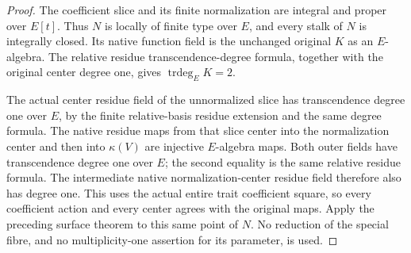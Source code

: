 \begin{proof}
The coefficient slice and its finite normalization are integral and proper over $E[t]$. Thus $N$ is locally of finite type over $E$, and every stalk of $N$ is integrally closed. Its native function field is the unchanged original $K$ as an $E$-algebra. The relative residue transcendence-degree formula, together with the original center degree one, gives $\operatorname{trdeg}_E K=2$.

The actual center residue field of the unnormalized slice has transcendence degree one over $E$, by the finite relative-basis residue extension and the same degree formula. The native residue maps from that slice center into the normalization center and then into $\kappa(V)$ are injective $E$-algebra maps. Both outer fields have transcendence degree one over $E$; the second equality is the same relative residue formula. The intermediate native normalization-center residue field therefore also has degree one. This uses the actual entire trait coefficient square, so every coefficient action and every center agrees with the original maps. Apply the preceding surface theorem to this same point of $N$. No reduction of the special fibre, and no multiplicity-one assertion for its parameter, is used.
\end{proof}
